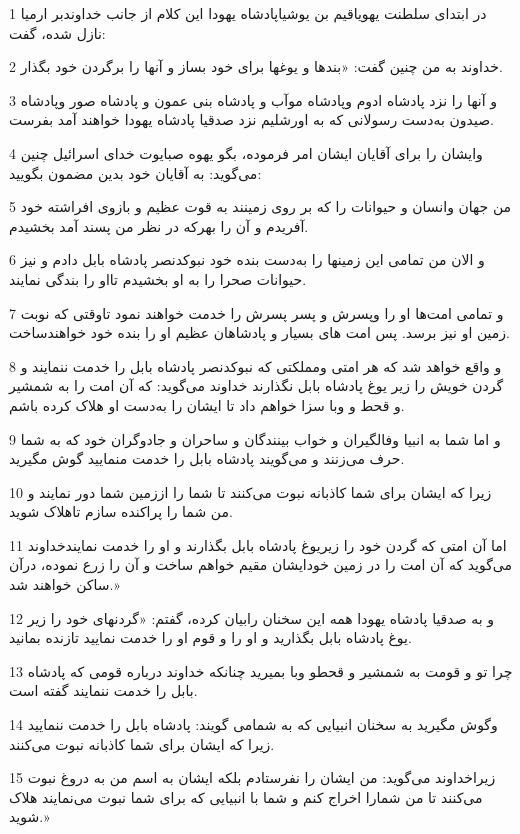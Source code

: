 \par 1 در ابتدای سلطنت یهویاقیم بن یوشیاپادشاه یهودا این کلام از جانب خداوندبر ارمیا نازل شده، گفت:
\par 2 خداوند به من چنین گفت: «بندها و یوغها برای خود بساز و آنها را برگردن خود بگذار.
\par 3 و آنها را نزد پادشاه ادوم وپادشاه موآب و پادشاه بنی عمون و پادشاه صور وپادشاه صیدون به‌دست رسولانی که به اورشلیم نزد صدقیا پادشاه یهودا خواهند آمد بفرست.
\par 4 وایشان را برای آقایان ایشان امر فرموده، بگو یهوه صبایوت خدای اسرائیل چنین می‌گوید: به آقایان خود بدین مضمون بگویید:
\par 5 من جهان وانسان و حیوانات را که بر روی زمینند به قوت عظیم و بازوی افراشته خود آفریدم و آن را بهر‌که در نظر من پسند آمد بخشیدم.
\par 6 و الان من تمامی این زمینها را به‌دست بنده خود نبوکدنصر پادشاه بابل دادم و نیز حیوانات صحرا را به او بخشیدم تااو را بندگی نمایند.
\par 7 و تمامی امت‌ها او را وپسرش و پسر پسرش را خدمت خواهند نمود تاوقتی که نوبت زمین او نیز برسد. پس امت های بسیار و پادشاهان عظیم او را بنده خود خواهندساخت.
\par 8 و واقع خواهد شد که هر امتی ومملکتی که نبوکدنصر پادشاه بابل را خدمت ننمایند و گردن خویش را زیر یوغ پادشاه بابل نگذارند خداوند می‌گوید: که آن امت را به شمشیر و قحط و وبا سزا خواهم داد تا ایشان را به‌دست او هلاک کرده باشم.
\par 9 و اما شما به انبیا وفالگیران و خواب بینندگان و ساحران و جادوگران خود که به شما حرف می‌زنند و می‌گویند پادشاه بابل را خدمت منمایید گوش مگیرید.
\par 10 زیرا که ایشان برای شما کاذبانه نبوت می‌کنند تا شما را اززمین شما دور نمایند و من شما را پراکنده سازم تاهلاک شوید.
\par 11 اما آن امتی که گردن خود را زیریوغ پادشاه بابل بگذارند و او را خدمت نمایندخداوند می‌گوید که آن امت را در زمین خودایشان مقیم خواهم ساخت و آن را زرع نموده، درآن ساکن خواهند شد.»
\par 12 و به صدقیا پادشاه یهودا همه این سخنان رابیان کرده، گفتم: «گردنهای خود را زیر یوغ پادشاه بابل بگذارید و او را و قوم او را خدمت نمایید تازنده بمانید.
\par 13 چرا تو و قومت به شمشیر و قحطو وبا بمیرید چنانکه خداوند درباره قومی که پادشاه بابل را خدمت ننمایند گفته است.
\par 14 وگوش مگیرید به سخنان انبیایی که به شمامی گویند: پادشاه بابل را خدمت ننمایید زیرا که ایشان برای شما کاذبانه نبوت می‌کنند.
\par 15 زیراخداوند می‌گوید: من ایشان را نفرستادم بلکه ایشان به اسم من به دروغ نبوت می‌کنند تا من شمارا اخراج کنم و شما با انبیایی که برای شما نبوت می‌نمایند هلاک شوید.»
